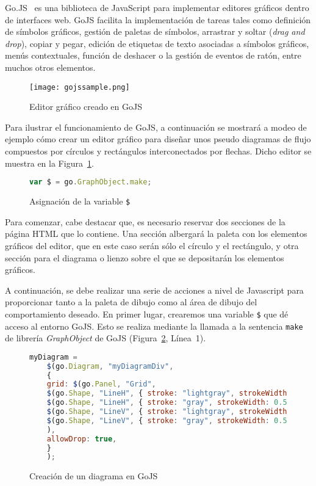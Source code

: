 Go.JS~\cite{gojs} es una biblioteca de JavaScript para implementar editores gráficos dentro de interfaces web. GoJS facilita la implementación de tareas tales como definición de símbolos gráficos, gestión de paletas de símbolos, arrastrar y soltar (\emph{drag and drop}), copiar y pegar, edición de etiquetas de texto asociadas a símbolos gráficos, menús contextuales, función de deshacer o la gestión de eventos de ratón, entre muchos otros elementos.

\begin{figure}[H]
	\centering
	\texttt{[image: gojssample.png]}
	\caption{Editor gráfico creado en GoJS}
	\label{fig:gojssample}
\end{figure}

Para ilustrar el funcionamiento de GoJS, a continuación se mostrará a modeo de ejemplo cómo crear un editor gráfico para diseñar unos pseudo diagramas de flujo compuestos por círculos y rectángulos interconectados por flechas. Dicho editor se muestra en la Figura~\ref{fig:gojssample}.

\begin{figure}[H]
	\centering
	\begin{lstlisting}[language=JavaScript]
	var $ = go.GraphObject.make;\end{lstlisting}
	\caption{Asignación de la variable \texttt{\$}}
	\label{fig:asignacionDollar}
\end{figure}

Para comenzar, cabe destacar que, es necesario reservar dos secciones de la página HTML que lo contiene. Una sección albergará la paleta con los elementos gráficos del editor, que en este caso serán sólo el círculo y el rectángulo, y otra sección para el diagrama o lienzo sobre el que se depositarán los elementos gráficos.

A continuación, se debe realizar una serie de acciones a nivel de Javascript para proporcionar tanto a la paleta de dibujo como al área de dibujo del comportamiento deseado. En primer lugar, crearemos una variable \texttt{\$} que dé acceso al entorno GoJS. Esto se realiza mediante la llamada a la sentencia \texttt{make} de librería \emph{GraphObject} de GoJS (Figura~\ref{fig:asignacionDollar}, Línea~1).

\begin{figure}[H]
	\centering
	\begin{lstlisting}[language=JavaScript]
	myDiagram =
	$(go.Diagram, "myDiagramDiv",
	{
	grid: $(go.Panel, "Grid",
	$(go.Shape, "LineH", { stroke: "lightgray", strokeWidth: 0.5 }),
	$(go.Shape, "LineH", { stroke: "gray", strokeWidth: 0.5, interval: 10 }),
	$(go.Shape, "LineV", { stroke: "lightgray", strokeWidth: 0.5 }),
	$(go.Shape, "LineV", { stroke: "gray", strokeWidth: 0.5, interval: 10 })
	),
	allowDrop: true,
	}
	);\end{lstlisting}
	\caption{Creación de un diagrama en GoJS}
	\label{fig:creacionDiagrama}
\end{figure}

